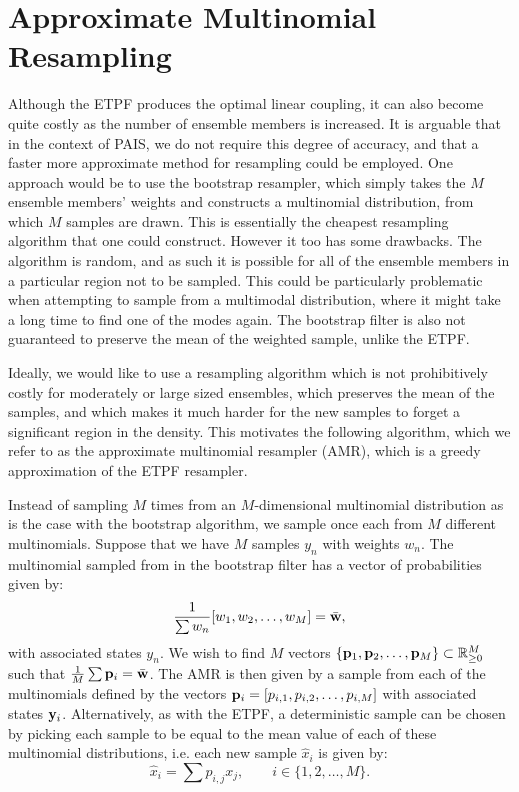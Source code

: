 \documentclass[final]{siamltex}
\begin{document}
\section{Approximate Multinomial Resampling}\label{sec:AMR}

Although the ETPF produces the optimal linear coupling, it can also become quite costly as the number of ensemble members
is increased. It is arguable that in the context of PAIS, we do not
require this degree of accuracy, and that a faster more approximate
method for resampling could be employed. One approach would be to use
the bootstrap resampler, which simply takes the $M$ ensemble members'
weights and constructs a multinomial distribution, from which $M$
samples are drawn. This is essentially the cheapest resampling
algorithm that one could construct. However it too has some
drawbacks. The algorithm is random, and as such it is possible for all
of the ensemble members in a particular region not to be sampled. This
could be particularly problematic when attempting to sample from a
multimodal distribution, where it might take a long time to find one
of the modes again. The bootstrap filter is also not guaranteed to
preserve the mean of the weighted sample, unlike the ETPF.

Ideally, we would like to use a resampling algorithm which is not
prohibitively costly for moderately or large sized ensembles,
which preserves the mean of the samples, and which makes it much
harder for the new samples to forget a significant region in the
density. This motivates the following algorithm, which we refer to as the
approximate multinomial resampler (AMR), which is a greedy
approximation of the ETPF resampler.

Instead of sampling $M$ times from an $M$-dimensional multinomial
distribution as is the case with the bootstrap algorithm, we sample
once each from $M$ different multinomials. Suppose that we have $M$
samples $y_n$ with weights $w_n$. The multinomial sampled from in the
bootstrap filter has a vector of probabilities given by:
\begin{equation*}
\frac{1}{\sum w_n} [w_1,w_2,\ldots,w_M] = \bar{\bf w},
\end{equation*}
with associated states $y_n$.
We wish to find $M$ vectors $\{{\bf p}_1,{\bf p}_2,\ldots,{\bf p}_M\}
\subset \mathbb{R}^M_{\ge 0}$
such that  $\frac{1}{M} \sum {\bf p}_i = \bar{\bf w}$. The AMR is then
given by a sample from each of the multinomials defined by the vectors
${\bf p}_i = [p_{i,1},p_{i,2},\ldots,p_{i,M}]$ with associated states ${\bf y}_i$. Alternatively, as with the ETPF, a deterministic sample
can be chosen by picking each sample to be equal to the mean value of
each of these multinomial distributions, i.e. each new sample
$\hat{x}_i$ is given by:
\begin{equation}
\hat{x}_i = \sum p_{i,j} x_j, \qquad i \in \{1,2,\ldots,M\}.
\end{equation}
\end{document}
